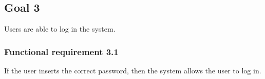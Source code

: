 \subsection{Goal 3}
Users are able to log in the system.

\setcounter{secnumdepth}{3}
\subsubsection{Functional requirement 3.1}
If the user inserts the correct password, then the system allows the user to log in.
